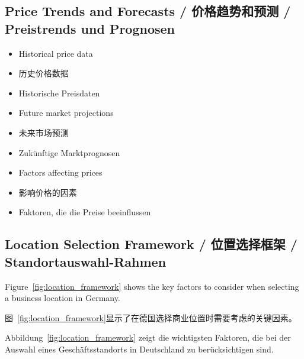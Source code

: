 \subsection{Price Trends and Forecasts / 价格趋势和预测 / Preistrends und Prognosen}
\begin{itemize}
    \item Historical price data
    \item 历史价格数据
    \item Historische Preisdaten
    \item Future market projections
    \item 未来市场预测
    \item Zukünftige Marktprognosen
    \item Factors affecting prices
    \item 影响价格的因素
    \item Faktoren, die die Preise beeinflussen
\end{itemize}

\subsection{Location Selection Framework / 位置选择框架 / Standortauswahl-Rahmen}

Figure~\ref{fig:location_framework} shows the key factors to consider when selecting a business location in Germany.

图~\ref{fig:location_framework}显示了在德国选择商业位置时需要考虑的关键因素。

Abbildung~\ref{fig:location_framework} zeigt die wichtigsten Faktoren, die bei der Auswahl eines Geschäftsstandorts in Deutschland zu berücksichtigen sind.

